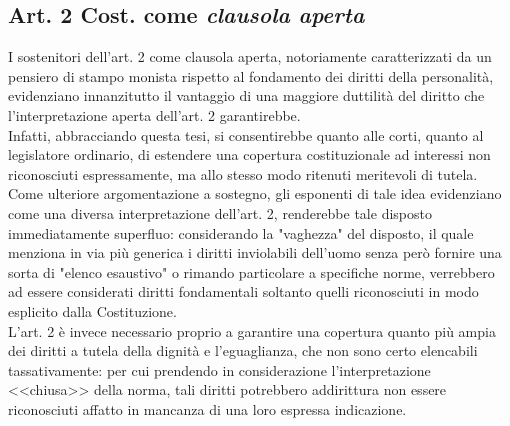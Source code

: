  
\subsection{Art. 2 Cost. come \textit{clausola aperta}}  

I sostenitori dell'art. 2 come clausola aperta, notoriamente caratterizzati da un pensiero di stampo monista rispetto al fondamento dei diritti della personalità, evidenziano innanzitutto il vantaggio di una maggiore duttilità del diritto che l'interpretazione aperta dell'art. 2 garantirebbe.
\\Infatti, abbracciando questa tesi, si consentirebbe quanto alle corti, quanto al legislatore ordinario, di estendere una copertura costituzionale ad interessi non riconosciuti espressamente, ma allo stesso modo ritenuti meritevoli di tutela. 
Come ulteriore argomentazione a sostegno, gli esponenti di tale idea evidenziano come una diversa interpretazione dell'art. 2, renderebbe tale disposto immediatamente superfluo: considerando la "vaghezza" del disposto, il quale menziona in via più generica i diritti inviolabili dell'uomo senza però fornire una sorta di "elenco esaustivo" o rimando particolare a specifiche norme, verrebbero ad essere considerati diritti fondamentali soltanto quelli riconosciuti in modo esplicito dalla Costituzione.
\\L'art. 2 è invece necessario proprio a garantire una copertura quanto più ampia dei diritti a tutela della dignità e l'eguaglianza, che non sono certo elencabili tassativamente: per cui prendendo in considerazione l'interpretazione <<chiusa>> della norma, tali diritti potrebbero addirittura non essere riconosciuti affatto in mancanza di una loro espressa indicazione.
 
